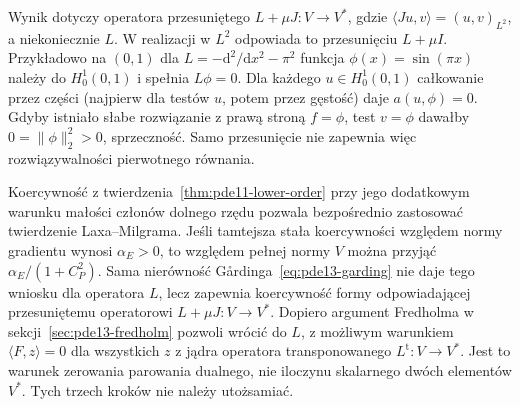 \begin{uwaga}
Wynik dotyczy operatora przesuniętego $L+\mu J:V\to V^*$,
gdzie $\langle Ju,v\rangle=(u,v)_{L^2}$, a niekoniecznie $L$.
W realizacji w $L^2$ odpowiada to przesunięciu $L+\mu I$.
Przykładowo na $(0,1)$ dla $L=-\mathrm d^2/\mathrm dx^2-\pi^2$
funkcja $\phi(x)=\sin(\pi x)$ należy do $H_0^1(0,1)$
i spełnia $L\phi=0$. Dla każdego $u\in H_0^1(0,1)$
całkowanie przez części (najpierw dla testów $u$, potem przez
gęstość) daje $a(u,\phi)=0$.
Gdyby istniało słabe rozwiązanie z prawą stroną $f=\phi$,
test $v=\phi$ dawałby $0=\|\phi\|_2^2>0$, sprzeczność.
Samo przesunięcie nie zapewnia więc rozwiązywalności
pierwotnego równania.
\end{uwaga}


\begin{uwaga}
\label{rem:pde-v42-garding}
Koercywność z twierdzenia~\ref{thm:pde11-lower-order}
przy jego dodatkowym warunku małości członów dolnego rzędu
pozwala bezpośrednio zastosować twierdzenie Laxa--Milgrama.
Jeśli tamtejsza stała koercywności względem normy gradientu
wynosi $\alpha_E>0$, to względem pełnej normy $V$ można
przyjąć $\alpha_E/(1+C_P^2)$.
Sama nierówność Gårdinga~\eqref{eq:pde13-garding}
nie daje tego wniosku dla operatora $L$, lecz zapewnia
koercywność formy odpowiadającej przesuniętemu operatorowi
$L+\mu J:V\to V^*$.
Dopiero argument Fredholma w sekcji~\ref{sec:pde13-fredholm}
pozwoli wrócić do $L$, z możliwym warunkiem
$\langle F,z\rangle=0$ dla wszystkich $z$ z jądra
operatora transponowanego $L^{\mathrm t}:V\to V^*$.
Jest to warunek zerowania parowania dualnego, nie iloczynu
skalarnego dwóch elementów $V^*$. Tych trzech kroków
nie należy utożsamiać.
\end{uwaga}

